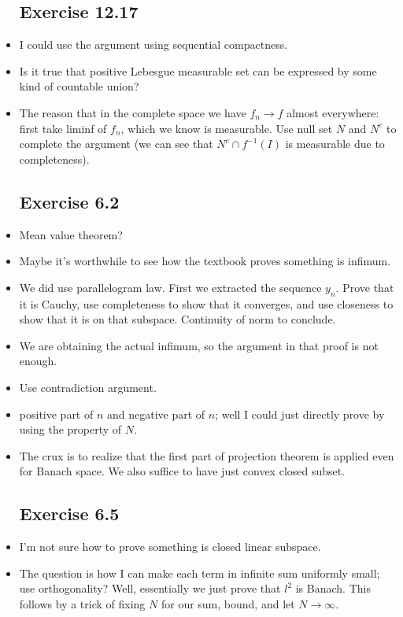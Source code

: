 \documentclass{article}
\theoremstyle{remark}
\begin{document}
\begin{itemize}
\subsection*{Exercise 12.17}
\item I could use the argument using sequential compactness.
\item Is it true that positive Lebesgue measurable set can be expressed by some kind of countable union?
\item The reason that in the complete space we have $f_n\to f$ almost everywhere: first take liminf of $f_n$, which we know is measurable. Use null set $N$ and $N^c$ to complete the argument (we can see that $N^c\cap f^{-1}(I)$ is measurable due to completeness).
\subsection*{Exercise 6.2}
\item Mean value theorem?
\item Maybe it's worthwhile to see how the textbook proves something is infimum.
\item We did use parallelogram law. First we extracted the sequence $y_n$. Prove that it is Cauchy, use completeness to show that it converges, and use closeness to show that it is on that subspace. Continuity of norm to conclude.
\item We are obtaining the actual infimum, so the argument in that proof is not enough.
\item Use contradiction argument. 
\item positive part of $n$ and negative part of $n$; well I could just directly prove by using the property of $N$.
\item The crux is to realize that the first part of projection theorem is applied even for Banach space. We also suffice to have just convex closed subset.

\subsection*{Exercise 6.5}
\item I'm not sure how to prove something is closed linear subspace.
\item The question is how I can make each term in infinite sum uniformly small; use orthogonality? Well, essentially we just prove that $l^2$ is Banach. This follows by a trick of fixing $N$ for our sum, bound, and let $N\to\infty$.

\end{itemize}
\end{document}
